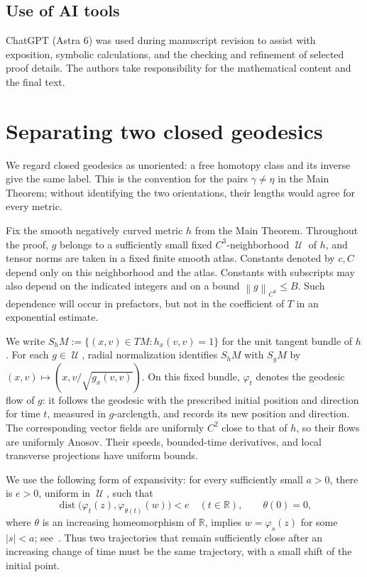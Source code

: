 \documentclass[10pt,oneside,reqno]{amsproc}
\numberwithin{equation}{section}
\theoremstyle{definition}
\theoremstyle{remark}
\newcommand{\norm}[1]{\left\|#1\right\|}
\DeclareMathOperator{\dist}{dist}
\DeclareMathOperator{\cU}{{\mathscr U}}
\renewcommand{\le}{\leqslant}
\begin{document}
\medskip
\subsection*{Use of AI tools} ChatGPT (Astra 6) was used during manuscript revision to assist with exposition, symbolic calculations, and the checking and refinement of selected proof details. The authors take responsibility for the mathematical content and the final text.



\section{Separating two closed geodesics}
\label{geo:section}

We regard closed geodesics as unoriented: a free homotopy class and its inverse give the same label. This is the convention for the pairs $\gamma\ne\eta$ in the Main Theorem; without identifying the two orientations, their lengths would agree for every metric.

Fix the smooth negatively curved metric $h$ from the Main Theorem. Throughout the proof, $g$ belongs to a sufficiently small fixed $C^3$-neighborhood $\cU$ of $h$, and tensor norms are taken in a fixed finite smooth atlas. Constants denoted by $c,C$ depend only on this neighborhood and the atlas. Constants with subscripts may also depend on the indicated integers and on a bound $\norm{g}_{C^k}\le B$. Such dependence will occur in prefactors, but not in the coefficient of $T$ in an exponential estimate.

We write $S_hM:=\{(x,v)\in TM:h_x(v,v)=1\}$ for the unit tangent bundle of $h$. For each $g\in\cU$, radial normalization identifies $S_hM$ with $S_gM$ by $(x,v)\mapsto(x,v/\sqrt{g_x(v,v)})$. On this fixed bundle, $\varphi_t$ denotes the geodesic flow of $g$: it follows the geodesic with the prescribed initial position and direction for time $t$, measured in $g$-arclength, and records its new position and direction. The corresponding vector fields are uniformly $C^2$ close to that of $h$, so their flows are uniformly Anosov. Their speeds, bounded-time derivatives, and local transverse projections have uniform bounds.

We use the following form of expansivity: for every sufficiently small $a>0$, there is $e>0$, uniform in $\cU$, such that
\[
 \dist\bigl(\varphi_t(z),\varphi_{\theta(t)}(w)\bigr)<e\quad(t\in\mathbb R),\qquad \theta(0)=0,
\]
where $\theta$ is an increasing homeomorphism of $\mathbb R$, implies $w=\varphi_s(z)$ for some $|s|<a$; see~\cite{Bowen,BW}. Thus two trajectories that remain sufficiently close after an increasing change of time must be the same trajectory, with a small shift of the initial point.
\end{document}
